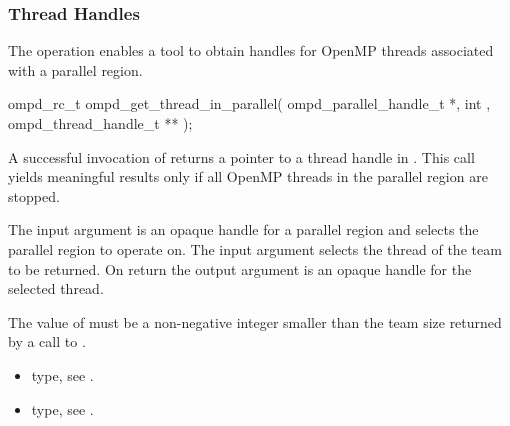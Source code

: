 \subsubsection{Thread Handles}

\label{subsubsubsec:ompd_get_thread_in_parallel}
\summary
The   operation enables a tool to obtain handles for 
OpenMP threads associated with a parallel region.

\format

\begin{cspecific}
\begin{ompSyntax}
ompd_rc_t ompd_get_thread_in_parallel(
  ompd_parallel_handle_t *,
  int ,
  ompd_thread_handle_t **
);
\end{ompSyntax}
\end{cspecific}


\descr
A successful invocation of   returns a pointer to 
a thread handle in . 
This call yields meaningful results only if all OpenMP threads in the parallel 
region are stopped.

\argdesc
The input argument  is an opaque handle for a parallel region
 and selects the parallel region to operate on.
The input argument  selects the thread of the team to be returned. 
On return the output argument  is an opaque handle for the selected thread.

\restrictions
The value of  must be a non-negative integer smaller than the
team size returned by a call to .

\crossreferences
\begin{itemize}
	\item {} type, see .
	\item {} type, see .
\end{itemize}

